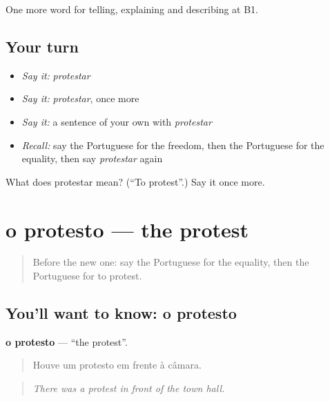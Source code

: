 \begin{grammarlens}[title={What you've built}]
One more word for telling, explaining and describing at B1.
\end{grammarlens}

\subsection*{Your turn}
\begin{itemize}
\raggedright
  \item \emph{Say it:} \emph{protestar}
  \item \emph{Say it:} \emph{protestar}, once more
  \item \emph{Say it:} a sentence of your own with \emph{protestar}
  \item \emph{Recall:} say the Portuguese for the freedom, then the Portuguese for the equality, then say \emph{protestar} again
\end{itemize}

\begin{tcolorbox}[breakable,colback=teal!4,colframe=teal!35!black,title={Before you move on}]
What does protestar mean? (\textquotedblleft{}To protest\textquotedblright{}.) Say it once more.
\end{tcolorbox}
\section[o protesto]{o protesto — the protest}

\label{lesson:PT-C364-protesto}



\begin{quote}
Before the new one: say the Portuguese for the equality, then the Portuguese for to protest.
\end{quote}

\subsection*{You'll want to know: o protesto}
\textbf{o protesto} — \textquotedblleft{}the protest\textquotedblright{}.

\begin{quote}
Houve um protesto em frente à câmara.
\end{quote}

\begin{quote}
\emph{There was a protest in front of the town hall.}
\end{quote}

